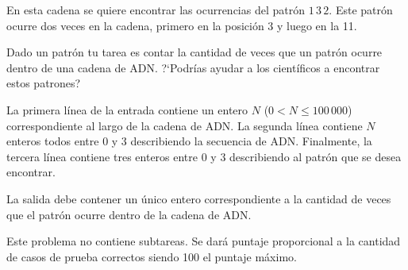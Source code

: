 \documentclass{oci}
\begin{document}
\begin{problemDescription}
  En esta cadena se quiere encontrar las ocurrencias del patrón $1\,3\,2$.
  Este patrón ocurre dos veces en la cadena, primero en la posición 3 y luego
  en la 11.
  
  Dado un patrón tu tarea es contar la cantidad de veces que un patrón ocurre
  dentro de una cadena de ADN.
  ?`Podrías ayudar a los científicos a encontrar estos patrones?
\end{problemDescription}

\begin{inputDescription}
  La primera línea de la entrada contiene un entero $N$ ($0 < N \leq 100\,000$)
  correspondiente al largo de la cadena de ADN.
  La segunda línea contiene $N$ enteros todos entre 0 y 3 describiendo la
  secuencia de ADN.
  Finalmente, la tercera línea contiene tres enteros entre 0 y 3 describiendo
  al patrón que se desea encontrar.
\end{inputDescription}

\begin{outputDescription}
  La salida debe contener un único entero correspondiente a la cantidad de veces
  que el patrón ocurre dentro de la cadena de ADN.
\end{outputDescription}

\begin{scoreDescription}
  Este problema no contiene subtareas.
  Se dará puntaje proporcional a la cantidad de casos de prueba correctos siendo
  100 el puntaje máximo.
\end{scoreDescription}

\begin{sampleDescription}
\end{sampleDescription}
\end{document}
